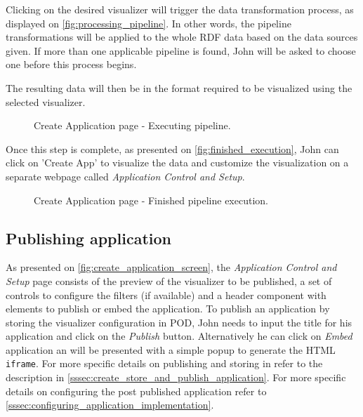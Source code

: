 Clicking on the desired visualizer will trigger the data transformation process, as displayed on \autoref{fig:processing_pipeline}. In other words, the pipeline transformations will be applied to the whole RDF data based on the data sources given. If more than one applicable pipeline is found, John will be asked to choose one before this process begins.

The resulting data will then be in the format required to be visualized using the selected visualizer.

\begin{figure}[h]
\centering
{}
\caption{Create Application page - Executing pipeline.}
\label{fig:processing_pipeline}
\end{figure}

Once this step is complete, as presented on \autoref{fig:finished_execution}, John can click on 'Create App' to visualize the data and customize the visualization on a separate webpage called \textit{Application Control and Setup}.

\begin{figure}[h]
\centering
{}
\caption{Create Application page - Finished pipeline execution.}
\label{fig:finished_execution}
\end{figure}

\subsection{Publishing application}

As presented on \autoref{fig:create_application_screen}, the \textit{Application Control and Setup} page consists of the preview of the visualizer to be published, a set of controls to configure the filters (if available) and a header component with elements to publish or embed the application. To publish an application by storing the visualizer configuration in \solid{} POD, John needs to input the title for his application and click on the \textit{Publish} button. Alternatively he can click on \textit{Embed} application an will be presented with a simple popup to generate the HTML \texttt{iframe}. For more specific details on publishing and storing in \solid{} refer to the description in \autoref{sssec:create_store_and_publish_application}. For more specific details on configuring the post published application refer to \autoref{sssec:configuring_application_implementation}.

